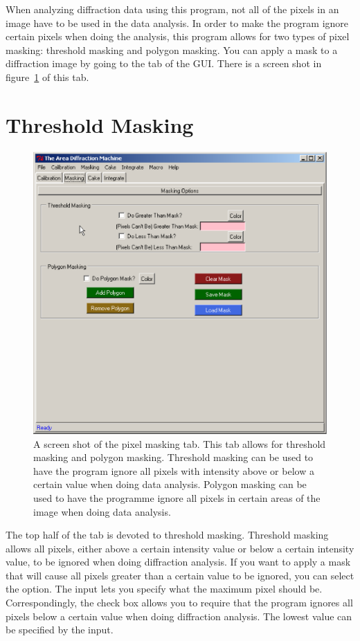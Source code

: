 When analyzing diffraction data using this program,
not all of the pixels in an image have to be used in
the data analysis. In order to make the program
ignore certain pixels when doing the analysis, this
program allows for two types of pixel masking:
threshold masking and polygon masking. You can apply
a mask to a diffraction image by going to the
 tab of the GUI. There is a screen
shot in figure~\ref{masking_page} of this tab.

\section{Threshold Masking}

\begin{figure}
    \centering
    \includegraphics[scale=.75]{figures/masking_page.eps}
    \caption{A screen shot of the pixel masking tab. This
    tab allows for threshold masking and polygon masking. 
    Threshold masking can be used to have the program 
    ignore all pixels with intensity above or below
    a certain value when doing data analysis. 
    Polygon masking can be used to have the programme
    ignore all pixels in certain areas of the image
    when doing data analysis.} 
    \label{masking_page}
\end{figure}

The top half of the  tab is devoted to 
threshold masking. Threshold masking allows all pixels, 
either above a certain intensity value or below a certain 
intensity value, to be ignored when doing diffraction 
analysis. If you want to apply a mask that will cause 
all pixels greater than a certain value to be ignored,
you can select the  option.
The  input 
lets you specify what the maximum pixel should be.
Correspondingly, the  check box
allows you to require that the program ignores all
pixels below a certain value when doing diffraction
analysis. The lowest value can be specified by the 
 input. 

